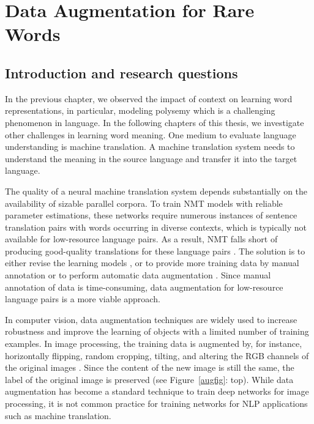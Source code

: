 
\chapter{Data Augmentation for Rare Words}
\label{chapter:research-02}

\section{Introduction and research questions}

In the previous chapter, we observed the impact of context on learning word representations, in particular, modeling polysemy which is a challenging phenomenon in language. 
In the following chapters of this thesis, we investigate other challenges in learning word meaning. 
One medium to evaluate language understanding is machine translation. 
A machine translation system needs to understand the meaning in the source language and transfer it into the target language. 

The quality of a neural machine translation system depends substantially on the availability of sizable parallel corpora.
To train NMT models with reliable parameter estimations, these networks require numerous instances of sentence translation pairs with words occurring in diverse contexts, which is typically not available for low-resource language pairs.
As a result, NMT falls short of producing good-quality translations for these language pairs \citep{zoph-EtAl:2016:EMNLP2016,koehn2017six,gu-etal-2018-meta,ngo-etal-2019-overcoming}.
The solution is to either revise the learning models \citep{ostling2017neural}, or to provide more training data by manual annotation \citep{Melamed98manualannotation} or to perform automatic data augmentation \citep{sennrich-haddow-birch:2016:P16-11,wang-etal-2018-switchout}. 
Since manual annotation of data is time-consuming, data augmentation for low-resource language pairs is a more viable approach.

In computer vision, data augmentation techniques are widely used to increase robustness and improve the learning of objects with a limited number of training examples. 
In image processing, the training data is augmented  
by, for instance, horizontally flipping, random cropping, tilting, and altering the RGB channels of the original images \citep{NIPS2012_4824,DBLP:conf/bmvc/ChatfieldSVZ14}. Since the content of the new image is still the same, the label of the original image is preserved (see Figure~\ref{augfig}: top).
While data augmentation has become a standard technique to train deep networks for image processing, it is not common practice for training networks for NLP applications such as machine translation.

